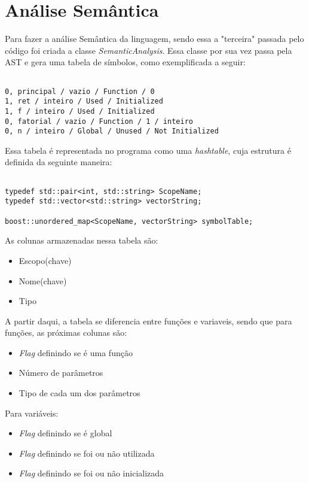 \documentclass[12pt,a4paper,final]{article}
\begin{document}
\section*{Análise Semântica}

Para fazer a análise Semântica da linguagem, sendo essa a "terceira" passada pelo código foi criada a classe \textit{SemanticAnalysis}. Essa classe por sua vez passa pela AST e gera uma tabela de símbolos, como exemplificada a seguir:

\begin{lstlisting}

0, principal / vazio / Function / 0
1, ret / inteiro / Used / Initialized
1, f / inteiro / Used / Initialized
0, fatorial / vazio / Function / 1 / inteiro
0, n / inteiro / Global / Unused / Not Initialized

\end{lstlisting}

Essa tabela é representada no programa como uma \textit{hashtable}, cuja estrutura é definida da seguinte maneira:

\begin{lstlisting}

typedef std::pair<int, std::string> ScopeName;
typedef std::vector<std::string> vectorString;

boost::unordered_map<ScopeName, vectorString> symbolTable;

\end{lstlisting}

As colunas armazenadas nessa tabela são:
\begin{itemize}
\item Escopo(chave)
\item Nome(chave)
\item Tipo
\end{itemize}
A partir daqui, a tabela se diferencia entre funções e variaveis, sendo que para funções, as próximas colunas são:
\begin{itemize}
\item \textit{Flag} definindo se é uma função
\item Número de parâmetros
\item Tipo de cada um dos parâmetros
\end{itemize}
Para variáveis:
\begin{itemize}
\item \textit{Flag} definindo se é global
\item \textit{Flag} definindo se foi ou não utilizada
\item \textit{Flag} definindo se foi ou não inicializada
\end{itemize}
\end{document}
